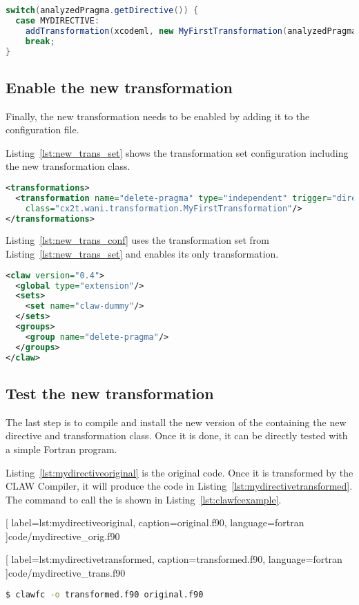 \begin{lstlisting}[label=lst:categorization, caption=ClawTranslator.java, 
  language=java]
switch(analyzedPragma.getDirective()) {
  case MYDIRECTIVE:
    addTransformation(xcodeml, new MyFirstTransformation(analyzedPragma));
    break;
}
\end{lstlisting}


\subsection{Enable the new transformation}
Finally, the new transformation needs to be enabled by adding it to the
configuration file.

Listing~\ref{lst:new_trans_set} shows the transformation set configuration
including the new transformation class.


\begin{lstlisting}[label=lst:new_trans_set, caption=claw-dummy-set.xml, language=xml]
<transformations>
  <transformation name="delete-pragma" type="independent" trigger="directive"
    class="cx2t.wani.transformation.MyFirstTransformation"/>
</transformations>
\end{lstlisting}

Listing~\ref{lst:new_trans_conf} uses the transformation set from 
Listing~\ref{lst:new_trans_set} and enables its only transformation.

\begin{lstlisting}[label=lst:new_trans_conf, caption=claw-dummy.xml, language=xml]
<claw version="0.4">
  <global type="extension"/>
  <sets>
    <set name="claw-dummy"/>
  </sets>
  <groups>
    <group name="delete-pragma"/>
  </groups>
</claw>
\end{lstlisting}

\subsection{Test the new transformation}
The last step is to compile and install the new version of the \clawfcomp
containing the new directive and transformation class. Once it is done, it
can be directly tested with a simple Fortran program.

Listing~\ref{lst:mydirectiveoriginal} is the original code. Once it is
transformed by the CLAW Compiler, it will produce the code
in Listing~\ref{lst:mydirectivetransformed}. The command to call
the \clawfcomp is shown in Listing~\ref{lst:clawfcexample}.


  [
    label=lst:mydirectiveoriginal,
    caption=original.f90,
    language=fortran
  ]{code/mydirective_orig.f90}


  [
    label=lst:mydirectivetransformed,
    caption=transformed.f90,
    language=fortran
  ]{code/mydirective_trans.f90}

\begin{lstlisting}[label=lst:clawfcexample, caption=Call the compiler, language=bash]
$ clawfc -o transformed.f90 original.f90
\end{lstlisting}
